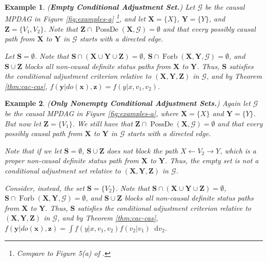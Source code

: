 \documentclass[twoside]{article}
\newtheorem{example}{Example}
\DeclareMathOperator{\PossDe}{PossDe}
\DeclareMathOperator{\Forb}{Forb}
\newcommand{\fb}[2][X,Y]{\Forb(\mb{#1},#2)}
\newcommand{\mb}[1]{\mathbf{#1}}
\newcommand{\g}[1][G]{\mathcal{#1}}
\newcommand*\diff{\mathop{}\!\mathrm{d}}
\begin{document}
\begin{example} 
\label{ex:cas-empty}
{\normalfont (\textbf{Empty Conditional Adjustment Set.})}
    Let $\g$ be the causal MPDAG in Figure \ref{fig:examples-a} \footnote{Compare to Figure 5(a) of \cite{perkovic2020identifying}.}, and let $\mb{X} = \{X\}$, $\mb{Y}=\{Y\}$, and $\mb{Z}=\{V_1, V_2\}$. Note that $\mb{Z} \cap \PossDe(\mb{X}, \g) = \emptyset$ and that every possibly causal path from $\mb{X}$ to $\mb{Y}$ in $\g$ starts with a directed edge.

    Let $\mb{S} = \emptyset$. Note that $\mb{S} \cap (\mb{X} \cup \mb{Y} \cup \mb{Z}) = \emptyset$, $\mb{S} \cap \fb{\g} = \emptyset$, and $\mb{S} \cup \mb{Z}$ blocks all non-causal definite status paths from $\mb{X}$ to $\mb{Y}$. Thus, $\mb{S}$ satisfies the conditional adjustment criterion relative to $(\mb{X},\mb{Y},\mb{Z})$ in $\g$, and by Theorem \ref{thm:cac-cas}, $f(\mb{y}|do(\mb{x}), \mb{z}) = f(y | x, v_1, v_2)$.
\end{example} 






\begin{example}
\label{ex:cas-nonempty}
{\normalfont (\textbf{Only Nonempty Conditional Adjustment Sets.})}
    Again let $\g$ be the causal MPDAG in Figure \ref{fig:examples-a}, where $\mb{X} = \{X\}$ and $\mb{Y}=\{Y\}$. But now let $\mb{Z}=\{V_1\}$. We still have that $\mb{Z} \cap \PossDe(\mb{X}, \g) = \emptyset$ and that every possibly causal path from $\mb{X}$ to $\mb{Y}$ in $\g$ starts with a directed edge.

    Note that if we let $\mb{S} = \emptyset$, $\mb{S} \cup \mb{Z}$ does not block the path $X \gets V_2 \to Y$, which is a proper non-causal definite status path from $\mb{X}$ to $\mb{Y}$. Thus, the empty set is not a conditional adjustment set relative to $(\mb{X,Y,Z})$ in $\g$.

    Consider, instead, the set $\mb{S} = \{V_2\}$. Note that $\mb{S} \cap (\mb{X} \cup \mb{Y} \cup \mb{Z}) = \emptyset$, $\mb{S} \cap \fb{\g} = \emptyset$, and $\mb{S} \cup \mb{Z}$ blocks all non-causal definite status paths from $\mb{X}$ to $\mb{Y}$. Thus, $\mb{S}$ satisfies the conditional adjustment criterion relative to $(\mb{X,Y,Z})$ in $\g$, and by Theorem \ref{thm:cac-cas}, $f(\mb{y}|do(\mb{x}), \mb{z}) = \int f(y | x, v_1, v_2) f(v_2|v_1) \diff v_2$.
\end{example}
\end{document}
